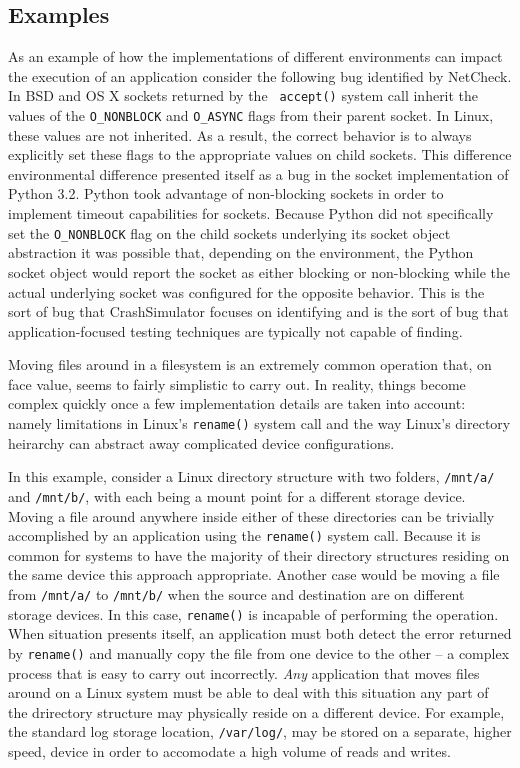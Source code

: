     \subsection{Examples}

    As an example of how the implementations of different environments can impact the execution of an application
    consider the following bug identified by NetCheck.  In BSD and OS X sockets returned by the {\tt
      accept()} system call inherit the values of the {\tt O\_NONBLOCK} and {\tt O\_ASYNC} flags from their parent
    socket.  In Linux, these values are not inherited.  As a result, the correct behavior is to always explicitly
    set these flags to the appropriate values on child sockets.  This difference environmental difference presented
    itself as a bug in the socket implementation of Python 3.2.  Python took advantage of non-blocking sockets in
    order to implement timeout capabilities for sockets.  Because Python did not specifically set the {\tt O\_NONBLOCK}
    flag on the child sockets underlying its socket object abstraction it was possible that, depending on the
    environment, the Python socket object would report the socket as either blocking or non-blocking while the actual
    underlying socket was configured for the opposite behavior.  This is the sort of bug that CrashSimulator focuses on
    identifying and is the sort of bug that application-focused testing techniques are typically not capable of finding.
   
    Moving files around in a filesystem is an extremely common operation that, on face value, seems to fairly simplistic
    to carry out.  In reality, things become complex quickly once a few implementation details are taken into account:
    namely limitations in Linux's {\tt rename()} system call and the way Linux's directory heirarchy can abstract away
    complicated device configurations.

    In this example, consider a Linux directory structure with two folders, {\tt /mnt/a/} and {\tt /mnt/b/}, with each
    being a mount point for a different storage device.  Moving a file around anywhere inside either of these
    directories can be trivially accomplished by an application using the {\tt rename()} system call.  Because it is
    common for systems to have the majority of their directory structures residing on the same device this approach
    appropriate.  Another case would be moving a file from {\tt /mnt/a/} to {\tt /mnt/b/} when the source and destination are on
    different storage devices.  In this case, {\tt rename()} is incapable of performing the operation.  When situation
    presents itself, an application must both detect the error returned by {\tt rename()} and manually copy the file from one
    device to the other -- a complex process that is easy to carry out incorrectly.  \emph{Any} application that moves
    files around on a Linux system must be able to deal with this situation any part of the drirectory structure may
    physically reside on a different device.  For example, the standard log storage location, {\tt /var/log/}, may be stored
    on a separate, higher speed, device in order to accomodate a high volume of reads and writes.

